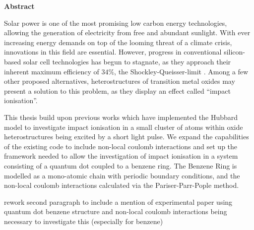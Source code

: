 \def\changemargin#1#2{\list{}{\rightmargin#2\leftmargin#1}\item[]}
\let\endchangemargin=\endlist 

{\small\begin{center}%
\bfseries{Abstract}
\end{center}}

\begin{changemargin}{1cm}{1cm}

Solar power is one of the most promising low carbon energy technologies, allowing the generation of electricity from free and abundant sunlight. With ever increasing energy demands on top of the looming threat of a climate crisis, innovations in this field are essential. However, progress in conventional silicon-based solar cell technologies has begun to stagnate, as they approach their inherent maximum efficiency of $34\%$, the Shockley-Queisser-limit \cite{shockley_queisser}. Among a few other proposed alternatives, heterostructures of transition metal oxides may present a solution to this problem, as they display an effect called ``impact ionisation''.

\smallskip

This thesis build upon previous works \cite{innerberger, worm_bachelor, prauhart, worm_project} which have implemented the Hubbard model to investigate impact ionisation in a small cluster of atoms within oxide heterostructures being excited by a short light pulse. We expand the capabilities of the existing code to include non-local coulomb interactions and set up the framework needed to allow the investigation of impact ionisation in a system consisting of a quantum dot coupled to a benzene ring. The Benzene Ring is modelled as a mono-atomic chain with periodic boundary conditions, and the non-local coulomb interactions calculated via the Pariser-Parr-Pople method.

\smallskip
{\color{blue} rework second paragraph to include a mention of experimental paper using quantum dot benzene structure and non-local coulomb interactions being necessary to investigate this (especially for benzene)}
\end{changemargin}